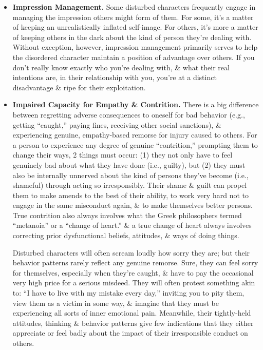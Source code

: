 \documentclass{article}
\numberwithin{equation}{section}
\begin{document}
\begin{itemize}
	\item \textbf{Impression Management.} Some disturbed characters frequently engage in managing the impression others might form of them. For some, it's a matter of keeping an unrealistically inflated self-image. For others, it's more a matter of keeping others in the dark about the kind of person they're dealing with. Without exception, however, impression management primarily serves to help the disordered character maintain a position of advantage over others. If you don't really know exactly who you're dealing with, \& what their real intentions are, in their relationship with you, you're at a distinct disadvantage \& ripe for their exploitation.
	\item \textbf{Impaired Capacity for Empathy \& Contrition.} There is a big difference between regretting adverse consequences to oneself for bad behavior (e.g., getting ``caught,'' paying fines, receiving other social sanctions), \& experiencing genuine, empathy-based remorse for injury caused to others. For a person to experience any degree of genuine ``contrition,'' prompting them to change their ways, 2 things must occur: (1) they not only have to feel genuinely bad about what they have done (i.e., guilty), but (2) they must also be internally unnerved about the kind of persons they've become (i.e., shameful) through acting so irresponsibly. Their shame \& guilt can propel them to make amends to the best of their ability, to work very hard not to engage in the same misconduct again, \& to make themselves better persons. True contrition also always involves what the Greek philosophers termed ``metanoia'' or a ``change of heart.'' \& a true change of heart always involves correcting prior dysfunctional beliefs, attitudes, \& ways of doing things.

	Disturbed characters will often scream loudly how sorry they are; but their behavior patterns rarely reflect any genuine remorse. Sure, they can feel sorry for themselves, especially when they're caught, \& have to pay the occasional very high price for a serious misdeed. They will often protest something akin to: ``I have to live with my mistake every day,'' inviting you to pity them, view them as a victim in some way, \& imagine that they must be experiencing all sorts of inner emotional pain. Meanwhile, their tightly-held attitudes, thinking \& behavior patterns give few indications that they either appreciate or feel badly about the impact of their irresponsible conduct on others.
	

\end{itemize}
\end{document}
